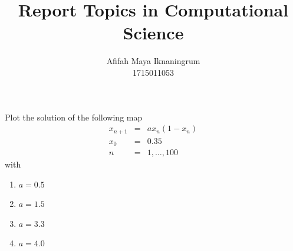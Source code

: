\documentclass[a4paper,10pt]{article}
\title{Report Topics in Computational Science}
\author{Afifah Maya Iknaningrum \\ 1715011053}
\begin{document}
	\maketitle
	
%	

Plot the solution of the following map
\begin{eqnarray}\nonumber
x_{n+1} &=& ax_{n}(1-x_{n}) \\ \nonumber
x_{0} &=& 0.35 \\ \nonumber
n  &=& 1,\dots,100
\end{eqnarray}
with
\begin{enumerate}
	\item $ a=0.5 $
	\item $ a=1.5 $
	\item $ a=3.3 $
	\item $ a=4.0 $
\end{enumerate}
\end{document}
